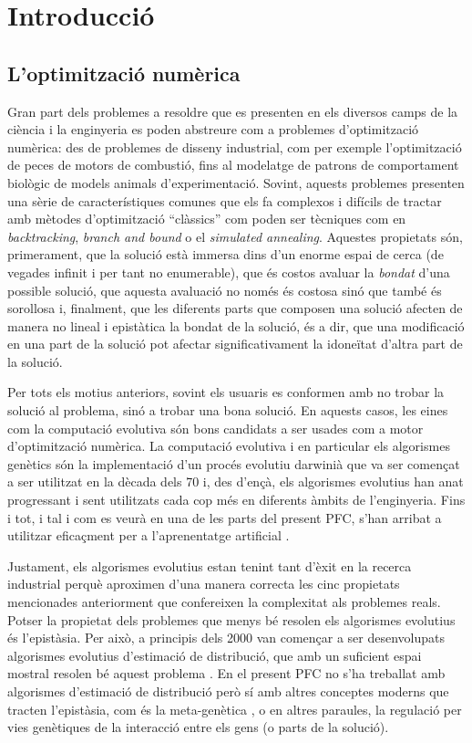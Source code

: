 \chapter{Introducció}
\section{L'optimització numèrica}
Gran part dels problemes a resoldre que es
presenten en els diversos camps de la ciència i la enginyeria es poden abstreure
com a problemes d'optimització numèrica: des de problemes de disseny industrial,
com per exemple l'optimització de peces de motors de combustió, fins al
modelatge de patrons de comportament biològic de models animals
d'experimentació. Sovint, aquests problemes presenten una sèrie de
característiques comunes que els fa complexos i difícils de tractar amb mètodes
d'optimització ``clàssics'' com poden ser tècniques com en \emph{backtracking},
\emph{branch and bound} o el \emph{simulated annealing}. Aquestes propietats
són, primerament, que la solució està immersa dins d'un enorme espai de cerca
(de vegades infinit i per tant no enumerable), que és costos avaluar la
\emph{bondat} d'una possible solució, que aquesta avaluació no només és costosa
sinó que també és sorollosa i, finalment, que les diferents parts que composen
una solució afecten de manera no lineal i epistàtica la bondat de la solució, és
a dir, que una modificació en una part de la solució pot afectar
significativament  la idoneïtat d'altra part de la solució.

Per tots els motius anteriors, sovint els usuaris es conformen amb no trobar la
solució al problema, sinó a trobar una bona solució. En aquests casos,  les
eines com la computació evolutiva són bons candidats a ser usades com a motor
d'optimització numèrica. La computació evolutiva i en particular els algorismes
genètics són la implementació d'un procés evolutiu darwinià que va ser començat
a ser utilitzat en la dècada dels 70 \cite{H75} i, des d'ençà, els algorismes
evolutius han anat progressant i sent utilitzats cada cop més en diferents
àmbits de l'enginyeria. Fins i tot, i tal i com es veurà en una de les parts del
present PFC, s'han arribat a utilitzar eficaçment per a l'aprenentatge
artificial \cite{G89}.

Justament, els algorismes evolutius estan tenint tant d'èxit en la recerca
industrial perquè aproximen d'una manera correcta les cinc propietats
mencionades anteriorment que confereixen la complexitat als problemes reals.
Potser la propietat dels problemes que menys bé resolen els algorismes evolutius
és l'epistàsia. Per això, a principis dels 2000 van començar a ser desenvolupats
algorismes evolutius d'estimació de distribució, que amb un suficient espai
mostral resolen bé aquest problema \cite{LL02}. En el present PFC no s'ha
treballat amb algorismes d'estimació de distribució però sí amb altres conceptes
moderns que tracten l'epistàsia, com és la meta-genètica \cite{ferreira:2006}, o
en altres paraules, la regulació per vies genètiques de la interacció entre els
gens (o parts de la solució).

